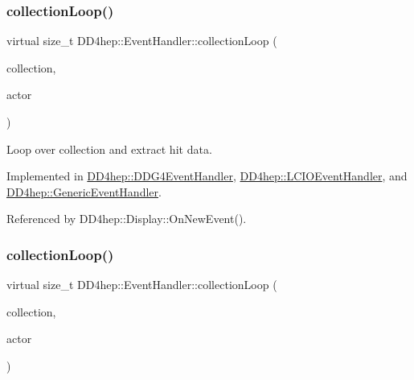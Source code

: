 \subsubsection{\texorpdfstring{collection\+Loop()}{collectionLoop()}\hspace{0.1cm}{\footnotesize\ttfamily [1/2]}}
{\footnotesize\ttfamily virtual size\+\_\+t D\+D4hep\+::\+Event\+Handler\+::collection\+Loop (\begin{DoxyParamCaption}\item[{const std\+::string \&}]{collection,  }\item[{\hyperlink{struct_d_d4hep_1_1_d_d_eve_hit_actor}{D\+D\+Eve\+Hit\+Actor} \&}]{actor }\end{DoxyParamCaption})\hspace{0.3cm}{\ttfamily [pure virtual]}}



Loop over collection and extract hit data. 



Implemented in \hyperlink{class_d_d4hep_1_1_d_d_g4_event_handler_a65645df58f694dea050f7d57d353dff4}{D\+D4hep\+::\+D\+D\+G4\+Event\+Handler}, \hyperlink{class_d_d4hep_1_1_l_c_i_o_event_handler_adbb8d55fec6962d692f19730fc5224fb}{D\+D4hep\+::\+L\+C\+I\+O\+Event\+Handler}, and \hyperlink{class_d_d4hep_1_1_generic_event_handler_a1186d6415d8d7e01f51993e204d5931f}{D\+D4hep\+::\+Generic\+Event\+Handler}.



Referenced by D\+D4hep\+::\+Display\+::\+On\+New\+Event().

\hypertarget{class_d_d4hep_1_1_event_handler_ae43595c2760736a7ca628183a2c91ec2}{}\label{class_d_d4hep_1_1_event_handler_ae43595c2760736a7ca628183a2c91ec2} 
\subsubsection{\texorpdfstring{collection\+Loop()}{collectionLoop()}\hspace{0.1cm}{\footnotesize\ttfamily [2/2]}}
{\footnotesize\ttfamily virtual size\+\_\+t D\+D4hep\+::\+Event\+Handler\+::collection\+Loop (\begin{DoxyParamCaption}\item[{const std\+::string \&}]{collection,  }\item[{\hyperlink{struct_d_d4hep_1_1_d_d_eve_particle_actor}{D\+D\+Eve\+Particle\+Actor} \&}]{actor }\end{DoxyParamCaption})\hspace{0.3cm}{\ttfamily [pure virtual]}}



